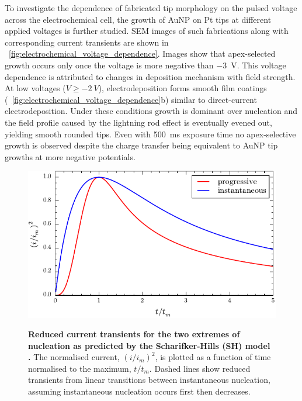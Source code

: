\documentclass{article}
\begin{document}
To investigate the dependence of fabricated tip morphology on the pulsed voltage across the electrochemical cell, the growth of AuNP on Pt tips at different applied voltages is further studied. SEM images of such fabrications along with corresponding current transients are shown in \figurename~\ref{fig:electrochemical_voltage_dependence}. Images show that apex-selected growth occurs only once the voltage is more negative than \SI{-3}{V}. This voltage dependence is attributed to changes in deposition mechanism with field strength.
At low voltages ($V \geq \SI{-2}{V}$), electrodeposition forms smooth film coatings (\figurename~\ref{fig:electrochemical_voltage_dependence}b) similar to direct-current electrodeposition. Under these conditions growth is dominant over nucleation and the field profile caused by the lightning rod effect is eventually evened out, yielding smooth rounded tips. Even with \SI{500}{ms} exposure time no apex-selective growth is observed despite the charge transfer being equivalent to AuNP tip growths at more negative potentials.

\begin{figure}[bt]
\centering
{\includegraphics{figures/nucleation_theory}}
{\caption[Reduced current transients for the two extremes of nucleation as predicted by the Scharifker-Hills (SH) model \cite{scharifker1983}.]{\textbf{Reduced current transients for the two extremes of nucleation as predicted by the Scharifker-Hills (SH) model \cite{scharifker1983}.} The normalised current, $(i/i_m)^2$, is plotted as a function of time normalised to the maximum, $t/t_m$. Dashed lines show reduced transients from linear transitions between instantaneous nucleation, assuming instantaneous nucleation occurs first then decreases.}
\label{fig:nucleation_theory}}
\vspace{-5pt}
\end{figure}
\end{document}
